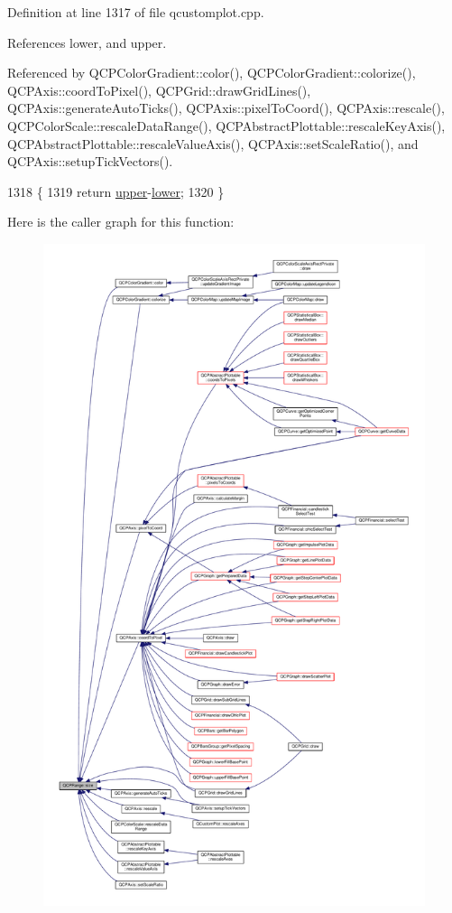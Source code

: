 Definition at line 1317 of file qcustomplot.\+cpp.



References lower, and upper.



Referenced by Q\+C\+P\+Color\+Gradient\+::color(), Q\+C\+P\+Color\+Gradient\+::colorize(), Q\+C\+P\+Axis\+::coord\+To\+Pixel(), Q\+C\+P\+Grid\+::draw\+Grid\+Lines(), Q\+C\+P\+Axis\+::generate\+Auto\+Ticks(), Q\+C\+P\+Axis\+::pixel\+To\+Coord(), Q\+C\+P\+Axis\+::rescale(), Q\+C\+P\+Color\+Scale\+::rescale\+Data\+Range(), Q\+C\+P\+Abstract\+Plottable\+::rescale\+Key\+Axis(), Q\+C\+P\+Abstract\+Plottable\+::rescale\+Value\+Axis(), Q\+C\+P\+Axis\+::set\+Scale\+Ratio(), and Q\+C\+P\+Axis\+::setup\+Tick\+Vectors().


\begin{DoxyCode}
1318 \{
1319   \textcolor{keywordflow}{return} \hyperlink{class_q_c_p_range_ae44eb3aafe1d0e2ed34b499b6d2e074f}{upper}-\hyperlink{class_q_c_p_range_aa3aca3edb14f7ca0c85d912647b91745}{lower};
1320 \}
\end{DoxyCode}


Here is the caller graph for this function\+:\nopagebreak
\begin{figure}[H]
\begin{center}
\leavevmode
\includegraphics[height=550pt]{class_q_c_p_range_afa57c13049b965edb6fd1c00ac56338a_icgraph}
\end{center}
\end{figure}


